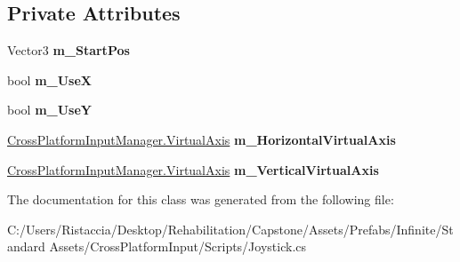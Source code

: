 \subsection*{Private Attributes}
\begin{DoxyCompactItemize}
\item 
\mbox{\label{class_unity_standard_assets_1_1_cross_platform_input_1_1_joystick_a071d826c0de37e2a2a27eeb2ec71cc9a}} 
Vector3 {\bfseries m\+\_\+\+Start\+Pos}
\item 
\mbox{\label{class_unity_standard_assets_1_1_cross_platform_input_1_1_joystick_a86205ca99668ff1e722937c7e2b3b771}} 
bool {\bfseries m\+\_\+\+UseX}
\item 
\mbox{\label{class_unity_standard_assets_1_1_cross_platform_input_1_1_joystick_afd605edd671a3c0218bb648cf5862ded}} 
bool {\bfseries m\+\_\+\+UseY}
\item 
\mbox{\label{class_unity_standard_assets_1_1_cross_platform_input_1_1_joystick_adf60811a49a3c43f3fe20b5d4bac449a}} 
\hyperlink{class_unity_standard_assets_1_1_cross_platform_input_1_1_cross_platform_input_manager_1_1_virtual_axis}{Cross\+Platform\+Input\+Manager.\+Virtual\+Axis} {\bfseries m\+\_\+\+Horizontal\+Virtual\+Axis}
\item 
\mbox{\label{class_unity_standard_assets_1_1_cross_platform_input_1_1_joystick_a7a2385c3fe1e19e73d9260bfad60fbcd}} 
\hyperlink{class_unity_standard_assets_1_1_cross_platform_input_1_1_cross_platform_input_manager_1_1_virtual_axis}{Cross\+Platform\+Input\+Manager.\+Virtual\+Axis} {\bfseries m\+\_\+\+Vertical\+Virtual\+Axis}
\end{DoxyCompactItemize}


The documentation for this class was generated from the following file\+:\begin{DoxyCompactItemize}
\item 
C\+:/\+Users/\+Ristaccia/\+Desktop/\+Rehabilitation/\+Capstone/\+Assets/\+Prefabs/\+Infinite/\+Standard Assets/\+Cross\+Platform\+Input/\+Scripts/Joystick.\+cs\end{DoxyCompactItemize}
